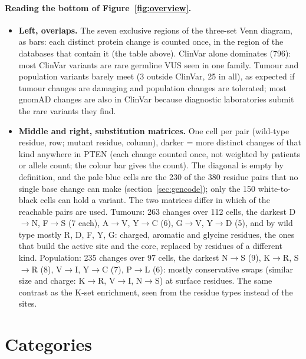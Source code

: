 \documentclass[11pt,a4paper]{article}
\begin{document}
\paragraph{Reading the bottom of Figure~\ref{fig:overview}.}
\begin{itemize}
\item \textbf{Left, overlaps.} The seven exclusive regions of the three-set
  Venn diagram, as bars: each distinct protein change is counted once, in the
  region of the databases that contain it (the table above). ClinVar alone
  dominates (796): most ClinVar variants are rare germline VUS seen in one
  family. Tumour and population variants barely meet (3 outside ClinVar, 25
  in all), as expected if tumour changes are damaging and population changes
  are tolerated; most gnomAD changes are also in ClinVar because diagnostic
  laboratories submit the rare variants they find.
\item \textbf{Middle and right, substitution matrices.} One cell per pair
  (wild-type residue, row; mutant residue, column), darker = more distinct
  changes of that kind anywhere in PTEN (each change counted once, not
  weighted by patients or allele count; the colour bar gives the count). The
  diagonal is empty by definition, and the pale blue cells are the 230 of the
  380 residue pairs that no single base change can make
  (section~\ref{sec:gencode}); only the 150 white-to-black cells can hold a
  variant. The two matrices differ in which
  of the reachable pairs are used. Tumours: 263 changes over 112 cells, the
  darkest D$\to$N, F$\to$S (7 each), A$\to$V, Y$\to$C (6), G$\to$V, Y$\to$D (5),
  and by wild type mostly R, D, F, Y, G: charged, aromatic and glycine
  residues, the ones that build the active site and the core, replaced by
  residues of a different kind. Population: 235 changes over 97 cells, the
  darkest N$\to$S (9), K$\to$R, S$\to$R (8), V$\to$I, Y$\to$C (7), P$\to$L (6):
  mostly conservative swaps (similar size and charge: K$\to$R, V$\to$I,
  N$\to$S) at surface residues. The same contrast as the K-set enrichment,
  seen from the residue types instead of the sites.
\end{itemize}

\section{Categories}
\end{document}
